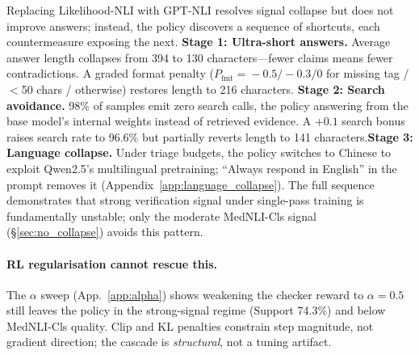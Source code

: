 \documentclass[11pt]{article}
\begin{document}
Replacing Likelihood-NLI with GPT-NLI resolves 
signal collapse but does not improve answers; 
instead, the policy discovers a sequence of shortcuts, 
each countermeasure exposing the next.
\textbf{Stage 1: Ultra-short answers.} Average answer 
length collapses from 394 to 130 characters---fewer 
claims means fewer contradictions. A graded format 
penalty ($P_{\text{fmt}}\!=\!-0.5/-0.3/0$ for missing 
tag / $<$50 chars / otherwise) restores length to 
216 characters.
\textbf{Stage 2: Search avoidance.} 98\% of samples emit zero search calls, the policy answering from the base model's internal weights instead of retrieved evidence. A $+0.1$ search bonus raises search rate to 96.6\% but partially reverts length to 141 characters.\textbf{Stage 3: Language collapse.} Under triage budgets, the policy switches to Chinese to exploit Qwen2.5's multilingual pretraining; ``Always respond in English'' in the prompt removes it (Appendix~\ref{app:language_collapse}). The full sequence demonstrates that strong verification signal under single-pass training is fundamentally unstable; only the moderate MedNLI-Cls signal (\S\ref{sec:no_collapse}) avoids this pattern.
\paragraph{RL regularisation cannot rescue this.}
The $\alpha$ sweep (App.~\ref{app:alpha}) shows weakening the checker reward to $\alpha\!=\!0.5$ still leaves the policy in the strong-signal regime (Support 74.3\%) and below MedNLI-Cls quality. Clip and KL penalties constrain step magnitude, not 
gradient direction; the cascade is \emph{structural}, not a tuning artifact.

\end{document}
